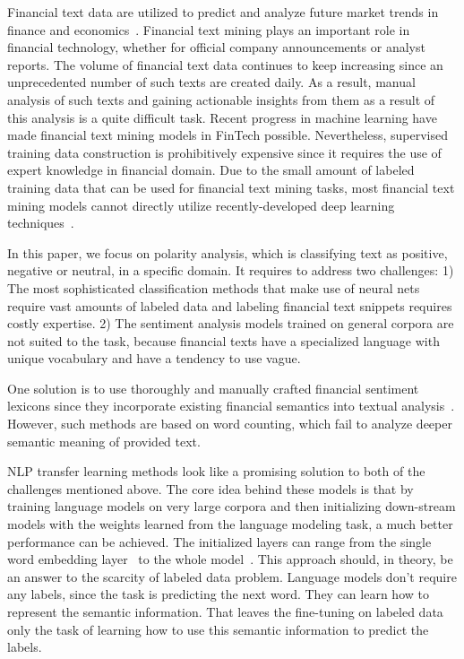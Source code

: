 \documentclass[11pt]{article}
\begin{document}
Financial text data are utilized to predict and analyze future market trends in finance and economics~\cite{xxx}. Financial text mining plays an important role in financial technology,
whether for official company announcements or analyst reports. The volume of financial text data continues to keep increasing since an unprecedented number of such texts are created daily.
As a result, manual analysis of such texts and gaining actionable insights from them as a result of this analysis is a quite difficult task.
Recent progress in machine learning have made financial text mining models in FinTech possible. Nevertheless, supervised training data construction is prohibitively expensive since it requires the
use of expert knowledge in financial domain. Due to the small amount of labeled training data that can be used for
financial text mining tasks, most financial text mining models cannot directly utilize recently-developed deep learning
techniques~\cite{xxx}.

In this paper, we focus on polarity analysis, which is classifying text as positive, negative or neutral,
in a specific domain. It requires to address two challenges: 1) The
most sophisticated classification methods that make use of neural
nets require vast amounts of labeled data and labeling financial
text snippets requires costly expertise. 2) The sentiment analysis
models trained on general corpora are not suited to the task, because
financial texts have a specialized language with unique vocabulary
and have a tendency to use vague.

One solution is to use thoroughly and manually crafted financial sentiment lexicons since they incorporate existing financial semantics into textual analysis~\cite{loughran2016}.
However, such methods are based on word counting, which 
fail to analyze deeper semantic meaning of provided text.

NLP transfer learning methods look like a promising solution
to both of the challenges mentioned above. The core idea behind these models is that by training
language models on very large corpora and then initializing down-stream models with the weights learned from the language
modeling task, a much better performance can be achieved. The
initialized layers can range from the single word embedding layer~\cite{peters2018} to the whole model~\cite{howard2018}. This approach should, in theory, be an
answer to the scarcity of labeled data problem. Language models
don’t require any labels, since the task is predicting the next word.
They can learn how to represent the semantic information. That
leaves the fine-tuning on labeled data only the task of learning how
to use this semantic information to predict the labels.
\end{document}
